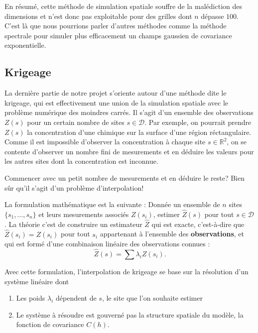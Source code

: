 \documentclass[10pt]{article} %
\begin{document}
En résumé, cette méthode de simulation spatiale souffre de la malédiction des dimensions et n'est donc pas exploitable pour des grilles
dont $n$ dépasse $100$. C'est là que nous pourrions parler d'autres méthodes comme la méthode spectrale pour simuler plus efficacement un
champs gaussien de covariance exponentielle.


\subsection{Krigeage} La dernière partie de notre projet s'oriente autour d'une méthode dite le krigeage, qui est effectivement une union de la simulation spatiale
avec le problème numérique des moindres carrés. Il s'agit d'un ensemble des observations $Z(s)$ pour un certain nombre de sites $s \in \mathcal{D}$. Par exemple, on pourrait
prendre $Z(s)$ la concentration d'une chimique sur la surface d'une région réctangulaire. Comme il est impossible d'observer la concentration à chaque site $s \in \mathbb{R}^2$,
on se contente d'observer un nombre fini de mesurements et en déduire les valeurs pour les autres sites dont la concentration est inconnue.

    Commencer avec un petit nombre de mesurements et en déduire le reste? Bien sûr qu'il s'agit d'un problème d'interpolation!

La formulation mathématique est la suivante : Donnée un ensemble de $n$ sites $\{s_1, \dots, s_n\}$ et leurs mesurements associés $Z(s_i)$, estimer
$\hat Z(s)$ pour tout $s \in \mathcal{D}$. La théorie c'est de construire un estimateur $\hat Z$ qui est exacte, c'est-à-dire que $\hat Z(s_i) = Z(s_i)$ pour
tout $s_i$ appartenant à l'ensemble des \textbf{observations}, et qui est formé d'une combinaison linéaire des observations connues :
$$ \hat Z(s) =  \sum \lambda_i Z(s_i).$$

Avec cette formulation, l'interpolation de krigeage se base sur la résolution d'un système linéaire dont
\begin{enumerate}
    \item Les poids $\lambda_i$ dépendent de $s$, le site que l'on souhaite estimer
    \item Le système à résoudre est gouverné pas la structure spatiale du modèle, la fonction de covariance $C(h)$.
\end{enumerate}
\end{document}
